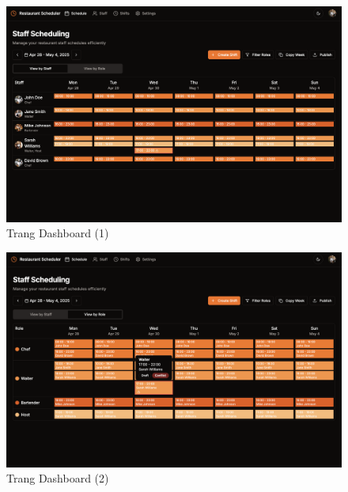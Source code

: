 

\begin{figure}[H]
	\centering
	\includegraphics[width=15cm]{Sections/tong_quan/functional_spec/img/proto1.1.png}

     \vspace{0.5cm}
    \caption{Trang Dashboard (1)}
\end{figure}
\begin{figure}[H]
	\centering
	\includegraphics[width=15cm]{Sections/tong_quan/functional_spec/img/proto1.2.png}

     \vspace{0.5cm}
    \caption{Trang Dashboard (2)}
\end{figure}
